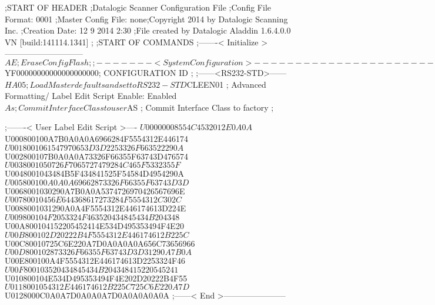 ;START OF HEADER
;Datalogic Scanner Configuration File
;Config File Format: 0001
;Master Config File: none;Copyright 2014 by Datalogic Scanning Inc.
;Creation Date: 12 9 2014 2:30
;File created by Datalogic Aladdin 1.6.4.0.0 VN [build:141114.1341]
;
;START OF COMMANDS
;-------< Initialize >-----------------------------
$AE                 ; Erase Config Flash
;
;-------< System Configuration >-------------------------------
$YF00000000000000000000; CONFIGURATION ID
;
;------<RS232-STD>------
$HA05               ; Load Master defaults and set to RS232-STD
$CLEEN01            ; Advanced Formatting/ Label Edit Script Enable: Enabled
$As                 ; Commit Interface Class to user
$AS                 ; Commit Interface Class to factory
;

;-------< User Label Edit Script >----
$U00000008554C4532012E0A0A
$U000800100A7B0A0A0A6966284F5554312E446174
$U0018001061547970653D3D2253326F663522290A
$U002800107B0A0A0A73326F66355F63743D476574
$U0038001050726F7065727479284C465F5332355F
$U0048001043484B5F434841525F54584D4954290A
$U005800100A0A0A69662873326F66355F63743D3D
$U0068001030290A7B0A0A5374726970426567696E
$U00780010456E644368617273284F5554312C302C
$U0088001031290A0A4F5554312E446174613D224E
$U009800104F2053324F463520434845434B204348
$U00A800104152205452414E534D495353494F4E20
$U00B800102D20222B4F5554312E446174612B225C
$U00C80010725C6E220A7D0A0A0A0A656C73656966
$U00D800102873326F66355F63743D3D31290A7B0A
$U00E800100A4F5554312E446174613D2253324F46
$U00F800103520434845434B204348415220545241
$U010800104E534D495353494F4E202D20222B4F55
$U0118001054312E446174612B225C725C6E220A7D
$U0128000C0A0A7D0A0A0A7D0A0A0A0A0A
;------< End >-----------------------
